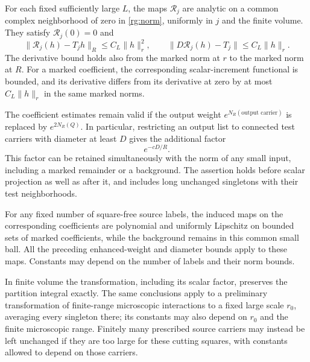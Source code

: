 \begin{proposition}
\label{rg:map}
For each fixed sufficiently large $L$, the maps $\mathcal R_j$ are analytic
on a common complex neighborhood of zero in \eqref{rg:norm}, uniformly in
$j$ and the finite volume.  They satisfy $\mathcal R_j(0)=0$ and
\begin{equation}
 \|\mathcal R_j(h)-T_jh\|_R\le C_L\|h\|_r^2,\qquad
 \|D\mathcal R_j(h)-T_j\|\le C_L\|h\|_r.
 \label{rg:quadratic}
\end{equation}
The derivative bound holds also from the marked norm at $r$ to the marked
norm at $R$.  For a marked coefficient, the corresponding scalar-increment
functional is bounded, and its derivative differs from its derivative
at zero by at most
$C_L\|h\|_r$ in the same marked norms.

The coefficient estimates remain valid if the output weight
$e^{N_R(\text{output carrier})}$ is replaced by $e^{2N_R(Q)}$.  In
particular, restricting an output list to connected test carriers
with diameter at least $D$ gives the additional factor
\begin{equation}
 e^{-cD/R}.
 \label{rg:diameter-gain}
\end{equation}
This factor can be retained simultaneously with the norm of any small
input, including a marked remainder or a background.  The assertion holds
before scalar projection as well as after it, and includes long unchanged
singletons with their test neighborhoods.

For any fixed number of square-free source labels, the induced maps on
the corresponding coefficients are polynomial and uniformly Lipschitz
on bounded sets of marked coefficients, while the background remains
in this common small ball.  All the preceding enhanced-weight and
diameter bounds apply to these maps.  Constants may depend on the number
of labels and their norm bounds.

In finite volume the transformation, including its scalar factor,
preserves the partition integral exactly.  The same conclusions apply to
a preliminary transformation of finite-range microscopic interactions
to a fixed large scale $r_0$, averaging every singleton there; its
constants may also depend on $r_0$ and the finite microscopic range.
Finitely many prescribed source carriers may instead be left unchanged
if they are too large for these cutting squares, with constants allowed
to depend on those carriers.
\end{proposition}

